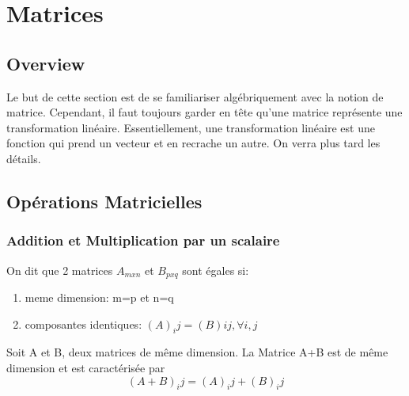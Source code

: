 \documentclass{article}
\begin{document}
\begin{remark}
\end{remark}

\pagebreak

\section{Matrices}
\subsection{Overview}

Le but de cette section est de se familiariser algébriquement avec la notion de
matrice. Cependant, il faut toujours garder en tête qu'une matrice représente
une transformation linéaire. Essentiellement, une transformation linéaire est
une fonction qui prend un vecteur et en recrache un autre. On verra plus tard
les détails.

\subsection{Opérations Matricielles}

\subsubsection{Addition et Multiplication par un scalaire}

\begin{definition}
    On dit que 2 matrices $A_{mxn}$ et $B_{pxq}$ sont égales si:
    \begin{enumerate}
	\item meme dimension: m=p et n=q
	\item composantes identiques: $(A)_ij = (B)ij, \forall i,j$
    \end{enumerate}
\end{definition}

\begin{definition}
    Soit A et B, deux matrices de même dimension. La Matrice A+B est
    de même dimension et est caractérisée par $$(A+B)_ij = (A)_ij + (B)_ij$$
\end{definition}

\begin{remark}

\end{remark}
\end{document}
